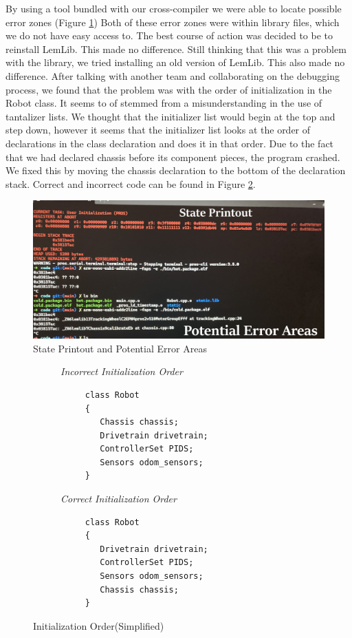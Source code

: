 \documentclass[12pt]{report}
\begin{document}
By using a tool bundled with our cross-compiler we were able to locate possible error zones (Figure \ref{FIG::statePrint})
Both of these error zones were within library files, which we do not have easy access to.
The best course of action was decided to be to reinstall LemLib. This made no difference.
Still thinking that this was a problem with the library, we tried installing an old version of LemLib. 
This also made no difference.
After talking with another team and collaborating on the debugging process, we found that the problem was with the order of initialization in the Robot class. 
It seems to of stemmed from a misunderstanding in the use of tantalizer lists.
We thought that the initializer list would begin at the top and step down,
    however it seems that the initializer list looks at the order of declarations in the class declaration and does it in that order.
Due to the fact that we had declared chassis before its component pieces, the program crashed.
We fixed this by moving the chassis declaration to the bottom of the declaration stack.
Correct and incorrect code can be found in Figure \ref{CODE::initOrderSimp}.
\begin{figure}
 \centering
 \caption{State Printout and Potential Error Areas}
 \label{FIG::statePrint}
 \includegraphics[scale=0.1]{statePrint}
\end{figure}

\pagebreak
\begin{figure}
\begin{subfigure}{0.5\textwidth}

\textit{Incorrect Initialization Order}
\begin{verbatim}
     class Robot
     {
        Chassis chassis;
        Drivetrain drivetrain;
        ControllerSet PIDS;
        Sensors odom_sensors;
     }
\end{verbatim}
\end{subfigure}%
\begin{subfigure}{0.5\textwidth}
\textit{Correct Initialization Order}
\begin{verbatim}
     class Robot
     {
        Drivetrain drivetrain;
        ControllerSet PIDS;
        Sensors odom_sensors;
        Chassis chassis;
     }

\end{verbatim}
\end{subfigure}
\caption{Initialization Order(Simplified)}
\label{CODE::initOrderSimp}
\end{figure}
\end{document}
